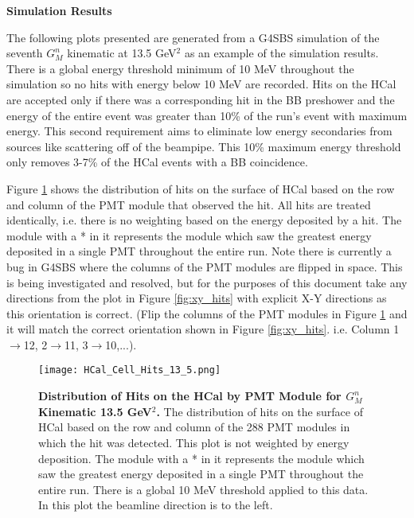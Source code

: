 \documentclass[10pt]{article}
\begin{document}
{\large \noindent \bf{Simulation Results}}
\vspace{3mm}

	The following plots presented are generated from a G4SBS simulation of the seventh $G_M^n$ kinematic at 13.5 GeV$^2$ as an example of the simulation results. There is a global energy threshold minimum of 10 MeV throughout the simulation so no hits with energy below 10 MeV are recorded. Hits on the HCal are accepted only if there was a corresponding hit in the BB preshower and the energy of the entire event was greater than 10\% of the run's event with maximum energy. This second requirement aims to eliminate low energy secondaries from sources like scattering off of the beampipe. This 10\% maximum energy threshold only removes 3-7\% of the HCal events with a BB coincidence. 
	\vspace{3mm}
	
	Figure \ref{fig:cell_hits} shows the distribution of hits on the surface of HCal based on the row and column of the PMT module that observed the hit. All hits are treated identically, i.e. there is no weighting based on the energy deposited by a hit. The module with a * in it represents the module which saw the greatest energy deposited in a single PMT throughout the entire run. Note there is currently a bug in G4SBS where the columns of the PMT modules are flipped in space. This is being investigated and resolved, but for the purposes of this document take any directions from the plot in Figure \ref{fig:xy_hits} with explicit X-Y directions as this orientation is correct. (Flip the columns of the PMT modules in Figure \ref{fig:cell_hits} and it will match the correct orientation shown in Figure \ref{fig:xy_hits}. i.e. Column 1$\rightarrow$12, 2$\rightarrow$11, 3$\rightarrow$10,...).
	\vspace{3mm}
	
	\begin{figure}[!ht]
	\begin{center}
	\texttt{[image: HCal\_Cell\_Hits\_13\_5.png]}
	\end{center}
	\caption{
	{\bf{Distribution of Hits on the HCal by PMT Module for $G_M^n$ Kinematic 13.5 GeV$^2$.}} The distribution of hits on the surface of HCal based on the row and column of the 288 PMT modules in which the hit was detected. This plot is not weighted by energy deposition. The module with a * in it represents the module which saw the greatest energy deposited in a single PMT throughout the entire run. There is a global 10 MeV threshold applied to this data. In this plot the beamline direction is to the left.}
	\label{fig:cell_hits}
	\end{figure}	
	
\end{document}
